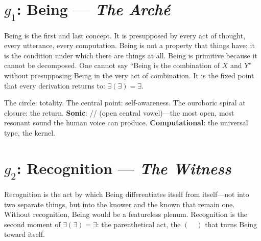 \documentclass[12pt, letterpaper]{book}
\def\equiv{=}%
\def\mathfrak#1{#1}%
\newcommand{\E}{\exists}                          %
\newcommand{\EE}{\exists(\exists)}                 %
\begin{document}
\section{$\mathfrak{g}_1$: Being --- \textit{The Arch\'{e}}}

Being is the first and last concept. It is presupposed by every act of thought, every utterance, every computation. Being is not a property that things have; it is the condition under which there are things at all. Being is primitive because it cannot be decomposed. One cannot say ``Being is the combination of $X$ and $Y$'' without presupposing Being in the very act of combination. It is the fixed point that every derivation returns to: $\EE \equiv \E$.

\begin{center}
\end{center}

The circle: totality. The central point: self-awareness. The ouroboric spiral at closure: the return. \textbf{Sonic}: /\textscripta/ (open central vowel)---the most open, most resonant sound the human voice can produce. \textbf{Computational}: the universal type, the kernel.



\section{$\mathfrak{g}_2$: Recognition --- \textit{The Witness}}

Recognition is the act by which Being differentiates itself from itself---not into two separate things, but into the knower and the known that remain one. Without recognition, Being would be a featureless plenum. Recognition is the second moment of $\EE \equiv \E$: the parenthetical act, the $(\quad)$ that turns Being toward itself.

\begin{center}
\end{center}
\end{document}
